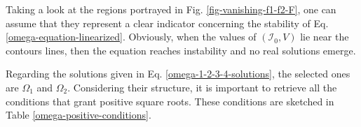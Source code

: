 Taking a look at the regions portrayed in Fig. \ref{fig-vanishing-f1-f2-F}, one can assume that they represent a clear indicator concerning the stability of Eq. \ref{omega-equation-linearized}. Obviously, when the values of $(\mathcal{I}_0,V)$ lie near the contours lines, then the equation reaches instability and no real solutions emerge.

Regarding the solutions given in Eq. \ref{omega-1-2-3-4-solutions}, the selected ones are $\Omega_1$ and $\Omega_2$. Considering their structure, it is important to retrieve all the conditions that grant positive square roots. These conditions are sketched in Table \ref{omega-positive-conditions}.
\begin{table}
    \centering
    \caption{The conditions for which the square roots that appear in the two solutions $\Omega_{1,2}$ given in Eq. \ref{omega-1-2-3-4-solutions} are positive, such that real quantities can be obtained. The trivial solution $B=C=0$ has been dismissed.}
    \label{omega-positive-conditions}
\end{table}

